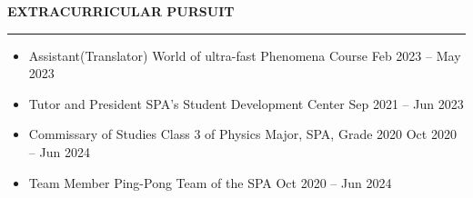 \documentclass[11pt,letterpaper]{article}
\begin{document}
\iffalse
\textbf{High School Awards:}
\vspace{-0.5em}
\begin{itemize}
    \itemsep -5pt {} 
    \item 2017, 2018 \hspace{3em} Third Prize \hspace{6em} Biology Olympiad in Shaanxi Provence
    \item 2018 \hspace{5.7em} Second Prize \hspace{4.9em} Chemistry Olympiad in Shaanxi Provence
    \item 2018 \hspace{5.7em} Third Prize \hspace{6em} Physics Olympiad in Shaanxi Provence
\end{itemize}
\fi


\vspace{1.6em}


\textbf{\MakeUppercase{Extracurricular pursuit}}
\vspace{0.5em}
\hrule
\vspace{-0.3em}

\begin{itemize}
    \itemsep -5pt {}
    \item Assistant(Translator) \hspace{3.2em} World of ultra-fast Phenomena Course \hfill Feb 2023 {--} May 2023
    \item Tutor and President \hspace{3.6em} SPA's Student Development Center \hfill Sep 2021 {--} Jun 2023
    \item Commissary of Studies \hspace{2em} Class 3 of Physics Major, SPA, Grade 2020 \hfill Oct 2020 {--} Jun 2024
    \item Team Member \hspace{5.95em} Ping-Pong Team of the SPA \hfill Oct 2020 {--} Jun 2024
\end{itemize}

\vspace{1.6em}
\end{document}
